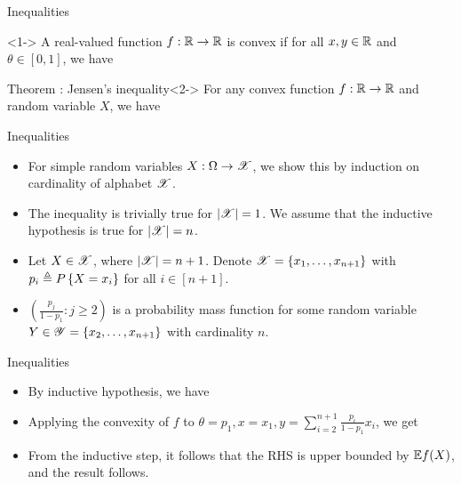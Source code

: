 \documentclass[12pt,aspectratio=169]{beamer}
\begin{document}
\begin{frame}{Inequalities}
\begin{Definition}<1->
A real-valued function $f: \mathbb{R} \to \mathbb{R}$ is convex if for all $x, y\in \mathbb{R}$ and $\theta \in [0,1]$, we have 
\end{Definition}
\begin{block}{Theorem : Jensen's inequality}<2->
For any convex function $f: \mathbb{R} \to \mathbb{R}$ and random variable $X$, we have 
\end{block}
\end{frame}

\begin{frame}{Inequalities}
\begin{Proof}
\begin{itemize}
\item <1-> For simple random variables $X: \Omega \to \mathscr{X}$, 
we show this by induction on cardinality of alphabet $\mathscr{X}$.  
\item <2-> The inequality is trivially true for $\left\lvert\mathscr{X}\right\rvert=1$. 
We assume that the inductive hypothesis is true for $\left\lvert\mathscr{X}\right\rvert = n$. 
\item <3-> Let $X \in \mathscr{X}$, where $\left\lvert\mathscr{X}\right\rvert = n+1$. 
Denote $\mathscr{X} = \left\{x_1, \dots, x_{n+1}\right\}$ with $p_i \triangleq P\left\{X = x_i\right\}$ for all $i \in [n+1]$. 
\item <4-> $(\frac{p_j}{1-p_1}: j \ge 2)$ is a probability mass function for some random variable $Y \in \mathscr{Y} = \left\{x_2, \dots, x_{n+1}\right\}$ with cardinality $n$. 
\end{itemize}
\end{Proof}
\end{frame}

\begin{frame}{Inequalities}
\begin{Proof}
\begin{itemize}
\item <1-> By inductive hypothesis, we have 
\item <2-> Applying the convexity of $f$ to $\theta = p_1, x = x_1, y = \sum_{i=2}^{n+1}\frac{p_i}{1-p_1}x_i$, we get 
\item <3-> From the inductive step, it follows that the RHS is upper bounded by $\mathbb{E} f(X)$, and the result follows.
\end{itemize}
\end{Proof}
\end{frame}
\end{document}
